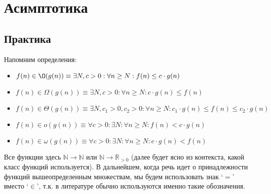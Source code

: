 \section{Асимптотика}

\subsection{Практика}

Напомним определения:
\begin{itemize}
  \item $f(n) \in \O(g(n))     \equiv \exists N, c > 0 : \forall n \ge N : f(n) \le c \cdot g(n)$
  \item $f(n) \in \Omega(g(n)) \equiv \exists N, c > 0 : \forall n \ge N : c \cdot g(n) \le f(n)$
  \item $f(n) \in \Theta(g(n)) \equiv \exists N, c_1 > 0, c_2 > 0 : \forall n \ge N : c_1 \cdot g(n) \le f(n) \le c_2 \cdot g(n)$
  \item $f(n) \in o(g(n))      \equiv \forall c > 0 : \exists N : \forall n \ge N : f(n) < c \cdot g(n)$
  \item $f(n) \in \omega(g(n)) \equiv \forall c > 0 : \exists N : \forall n \ge N : c \cdot g(n) < f(n)$
\end{itemize}
Все функции здесь $\mathbb{N} \to \mathbb{N}$ или $\mathbb{N} \to \mathbb{R}_{>0}$ (далее будет
ясно из контекста, какой класс функций используется). В дальнейшем, когда речь идет о принадлежности функций вышеопределенным множествам,
мы будем использовать знак `$=$' вместо `$\in$', т.к. в литературе
обычно используются именно такие обозначения.

